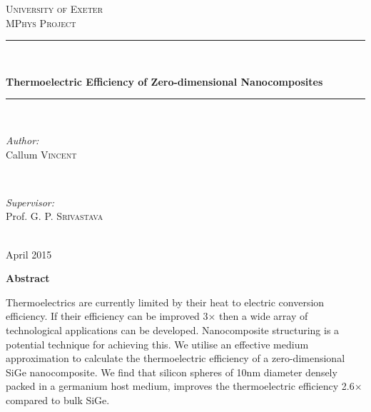 \documentclass[12pt,draft]{article}
\begin{document}

\pagestyle{empty}

\begin{titlepage}
\center
\textsc{\huge University of Exeter}\\[1cm]
\textsc{\Large MPhys Project}\\[1.5cm]

\rule{\linewidth}{0.5mm}\\[0.4cm]
\begin{doublespace}
{\LARGE \textbf{Thermoelectric Efficiency of Zero-dimensional Nanocomposites}}\\[0cm]
\end{doublespace}
\rule{\linewidth}{0.5mm}\\[2.5cm]
 
\begin{minipage}{0.4\textwidth}
\begin{flushleft} \large
\emph{Author:}\\
Callum \textsc{Vincent}
\end{flushleft}
\end{minipage}
~
\begin{minipage}{0.4\textwidth}
\begin{flushright} \large
\emph{Supervisor:} \\
Prof. G. P. \textsc{Srivastava}
\end{flushright}
\end{minipage}\\[4cm]

{\large April 2015}

\pagedecorationleft
\pagedecorationright
\end{titlepage}

\begin{center}
{\Huge\textbf{Abstract}}\\[2cm]
\end{center}
\begin{justify}
Thermoelectrics are currently limited by their heat to electric conversion efficiency. If their efficiency can be improved 3$\times$ then a wide array of technological applications can be developed. Nanocomposite structuring is a potential technique for achieving this. We utilise an effective medium approximation to calculate the thermoelectric efficiency of a zero-dimensional SiGe nanocomposite. We find that silicon spheres of 10nm diameter densely packed in a germanium host medium, improves the thermoelectric efficiency 2.6$\times$ compared to bulk SiGe.
\end{justify}
\end{document}
